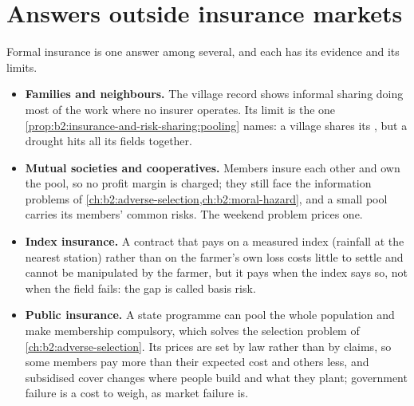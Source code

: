 \section{Answers outside insurance markets}\label{sec:b2:insurance-and-risk-sharing:outside}

Formal insurance is one answer among several, and each has its evidence and its limits.

\begin{itemize}
  \item \textbf{Families and neighbours.} The village record shows informal sharing doing most of the
        work where no insurer operates. Its limit is the one \cref{prop:b2:insurance-and-risk-sharing:pooling}
        names: a village shares its , but a drought hits all its fields together.
  \item \textbf{Mutual societies and cooperatives.} Members insure each other and own the pool, so no
        profit margin is charged; they still face the information problems of
        \cref{ch:b2:adverse-selection,ch:b2:moral-hazard}, and a small pool carries its members' common
        risks. The weekend problem prices one.
  \item \textbf{Index insurance.} A contract that pays on a measured index (rainfall at the nearest
        station) rather than on the farmer's own loss costs little to settle and cannot be
        manipulated by the farmer, but it pays when the index says so, not when the field fails: the
        gap is called basis risk.
  \item \textbf{Public insurance.} A state programme can pool the whole population and make
        membership compulsory, which solves the selection problem of \cref{ch:b2:adverse-selection}.
        Its prices are set by law rather than by claims, so some members pay more than their expected
        cost and others less, and subsidised cover changes where people build and what they plant;
        government failure is a cost to weigh, as market failure is.
\end{itemize}

